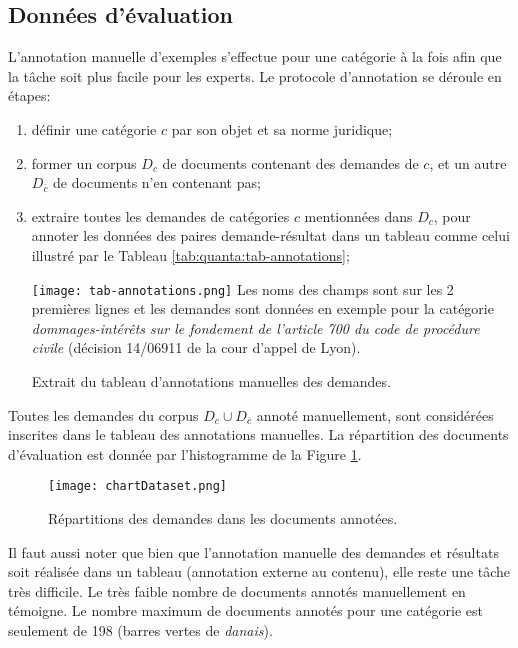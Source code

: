 \subsection{Données d'évaluation}
L'annotation manuelle d'exemples s'effectue pour une catégorie à la fois afin que la tâche soit plus facile pour les experts. Le protocole d'annotation se déroule en étapes: 
\begin{enumerate}
	\item définir une catégorie $c$ par son objet et sa norme juridique;
	\item former un corpus $D_c$ de documents contenant des demandes de $c$, et un autre $D_{\overline{c}}$ de documents n'en contenant pas; 
	\item extraire toutes les demandes de catégories $c$ mentionnées dans $D_c$, pour annoter les données des paires demande-résultat dans un tableau comme celui illustré par le  Tableau \ref{tab:quanta:tab-annotations};
	
	\begin{table}[!htb]
		\texttt{[image: tab-annotations.png]}
		\scriptsize{Les noms des champs sont sur les 2 premières lignes et les demandes sont données en exemple pour la catégorie \textit{dommages-intérêts sur le fondement de l'article 700 du code de procédure civile} (décision 14/06911 de la cour d'appel de Lyon).}
		\caption{Extrait du tableau d'annotations manuelles des demandes.} \label{tab:quanta:tab-annotations}
	\end{table}
\end{enumerate}


 Toutes les demandes du corpus $D_{c} \cup D_{\overline{c}}$  annoté manuellement, sont considérées inscrites dans le tableau des annotations manuelles. La répartition des documents d'évaluation est donnée par l'histogramme de la Figure \ref{fig:quanta:hist-repartition-docs}.  
 
 \begin{figure}[!htb]
 	\texttt{[image: chartDataset.png]}
 	\caption{Répartitions des demandes dans les documents annotées.}\label{fig:quanta:hist-repartition-docs}
 \end{figure}
 
 Il faut aussi noter que bien que l'annotation manuelle des demandes et résultats soit réalisée dans un tableau (annotation externe au contenu), elle reste une tâche très difficile. Le très faible nombre de documents annotés manuellement en témoigne. Le nombre  maximum de documents annotés pour une catégorie est seulement de 198 (barres vertes de \textit{danais}).%


